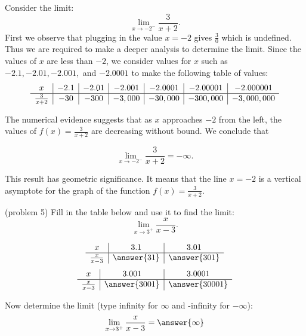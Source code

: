 \documentclass[handout]{ximera}
\begin{document}
\begin{example}[example 5]
Consider the limit:
\[\lim_{x \to -2^-} \frac{3}{x+2}. \]
First we observe that plugging in the value $x=-2$ gives $\frac{3}{0}$ which is undefined. 
Thus we are required to make a deeper analysis to determine the limit.
Since the values of $x$ are less than $-2$, we consider values for $x$ such as 
$-2.1, -2.01, -2.001,$ and $-2.0001$ to make the following table of values:\\

\[
\begin{array}{ c | c | c | c | c| c| c}
  x & -2.1 & -2.01 & -2.001 & -2.0001 & -2.00001 & -2.000001\\ 
	\hline  
	 \frac{3}{x+2} & -30 & -300 & -3,000 & -30,000 & -300,000 & -3,000,000
\end{array}
\] 

The numerical evidence suggests that as $x$ approaches $-2$ from the left, 
the values of $f(x) = \frac{3}{x+2}$ are decreasing without bound. We conclude that 

\[\lim_{x \to -2^-} \frac{3}{x+2} =  -\infty. \]

This result has geometric significance.  
It means that the line $x=-2$ is a vertical asymptote for the graph of the function $f(x) = \frac{3}{x+2}.$
\end{example}



\begin{problem}(problem 5)
Fill in the table below and use it to find the limit:
\[\lim_{x \to 3^+} \frac{x}{x-3}.\]

\begin{center}
\[
\begin{array}{ c | c | c }
  x & 3.1 & 3.01   \\ 
	\hline 
	 \frac{x}{x-3} & \answer{31} & \answer{301} 
\end{array}
\]
\[
\begin{array}{ c | c | c  }
  x  & 3.001 & 3.0001 \\ 
	\hline 
	 \frac{x}{x-3}  & \answer{3001} & \answer{30001}
\end{array}
\]
\end{center}
Now determine the limit (type infinity for $\infty$ and -infinity for $-\infty$):
\[
\lim_{x \to 3^+} \frac{x}{x-3} = \answer{\infty}
\]
\end{problem}
\end{document}
